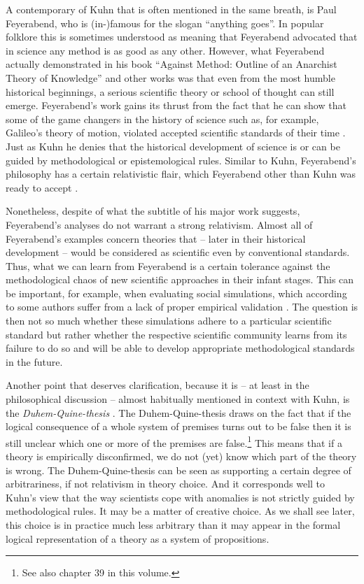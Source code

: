 \documentclass[12pt, a4paper]{article}
\begin{document}
A contemporary of Kuhn that is often mentioned in the same breath, is
Paul Feyerabend, who is (in-)famous for the slogan ``anything goes''.
In popular folklore this is sometimes understood as meaning that
Feyerabend advocated that in science any method is as good as any
other. However, what Feyerabend actually demonstrated in his book
``Against Method: Outline of an Anarchist Theory of Knowledge''
\citep{feyerabend:1975} and other works was that even from the most
humble historical beginnings, a serious scientific theory or school of
thought can still emerge. Feyerabend's work gains its thrust from the
fact that he can show that some of the game changers in the history of
science such as, for example, Galileo's theory of motion, violated
accepted scientific standards of their time \citep[ch.
9]{feyerabend:1975}. Just as Kuhn he denies that the historical
development of science is or can be guided by methodological or
epistemological rules. Similar to Kuhn, Feyerabend's philosophy has a
certain relativistic flair, which Feyerabend other than Kuhn was ready
to accept \citep[sec. 5]{preston:2016}.

Nonetheless, despite of what the subtitle of his major work suggests,
Feyerabend's analyses do not warrant a strong relativism. Almost all
of Feyerabend's examples concern theories that -- later in their
historical development -- would be considered as scientific even by
conventional standards. Thus, what we can learn from Feyerabend is a
certain tolerance against the methodological chaos of new scientific
approaches in their infant stages. This can be important, for example,
when evaluating social simulations, which according to some authors
suffer from a lack of proper empirical validation
\citep{heath-et-al:2009}. The question is then not so much whether
these simulations adhere to a particular scientific standard but
rather whether the respective scientific community learns from its
failure to do so and will be able to develop appropriate
methodological standards in the future.

Another point that deserves clarification, because it is -- at least
in the philosophical discussion -- almost habitually mentioned in
context with Kuhn, is the {\em Duhem-Quine-thesis}
\citep{harding:1976}. The Duhem-Quine-thesis draws on the fact that if
the logical consequence of a whole system of premises turns out to be
false then it is still unclear which one or more of the premises are
false.\footnote{See also chapter 39 \citep{lenhard:2019} in this
volume.} This means that if a theory is empirically disconfirmed, we
do not (yet) know which part of the theory is wrong. The
Duhem-Quine-thesis can be seen as supporting a certain degree of
arbitrariness, if not relativism in theory choice. And it corresponds
well to Kuhn's view that the way scientists cope with anomalies is not
strictly guided by methodological rules. It may be a matter of
creative choice. As we shall see later, this choice is in practice
much less arbitrary than it may appear in the formal logical
representation of a theory as a system of propositions.
\end{document}
